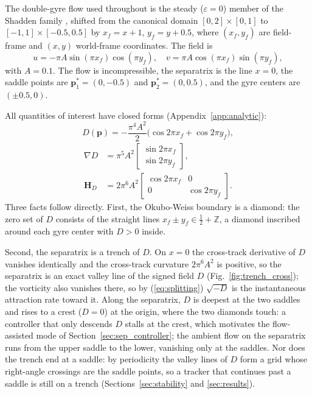 \documentclass[lettersize,journal]{IEEEtran}
\begin{document}
The double-gyre flow used throughout is the steady ($\varepsilon = 0$)
member of the Shadden family \cite{8}, shifted from the canonical domain
$[0,2] \times [0,1]$ to $[-1,1] \times [-0.5, 0.5]$ by
$x_f = x + 1$, $y_f = y + 0.5$, where $(x_f, y_f)$ are field-frame and
$(x, y)$ world-frame coordinates. The field is
\begin{equation}
    u = -\pi A \sin(\pi x_f) \cos(\pi y_f), \quad
    v = \pi A \cos(\pi x_f) \sin(\pi y_f),
    \label{eq:dg_u}
\end{equation}
with $A = 0.1$. The flow is incompressible, the separatrix is the line
$x = 0$, the saddle points are $\mathbf{p}^*_1 = (0, -0.5)$ and
$\mathbf{p}^*_2 = (0, 0.5)$, and the gyre centers are $(\pm 0.5, 0)$.

All quantities of interest have closed forms
(Appendix~\ref{app:analytic}):
\begin{equation}
    D(\mathbf{p}) = -\frac{\pi^4 A^2}{2}
    \bigl(\cos 2\pi x_f + \cos 2\pi y_f\bigr),
    \label{eq:det_analytic_main}
\end{equation}
\begin{equation}
    \begin{aligned}
    \nabla D &= \pi^5 A^2
    \begin{bmatrix} \sin 2\pi x_f \\ \sin 2\pi y_f \end{bmatrix},
    \\
    \mathbf{H}_D &= 2\pi^6 A^2
    \begin{bmatrix} \cos 2\pi x_f & 0 \\ 0 & \cos 2\pi y_f \end{bmatrix}.
    \end{aligned}
    \label{eq:gradhess_analytic_main}
\end{equation}
Three facts follow directly. First, the Okubo-Weiss boundary is a
diamond: the zero set of $D$ consists of the straight lines $x_f \pm
y_f \in \tfrac{1}{2} + \mathbb{Z}$, a diamond inscribed around each
gyre center with $D > 0$ inside.

Second, the separatrix is a trench of $D$. On $x = 0$ the cross-track
derivative of $D$ vanishes identically and the cross-track curvature
$2\pi^6 A^2$ is positive, so the separatrix is an exact valley line of
the signed field $D$ (Fig.~\ref{fig:trench_cross}); the vorticity also
vanishes there, so by (\ref{eq:splitting}) $\sqrt{-D}$ is the
instantaneous attraction rate toward it. Along the separatrix, $D$ is
deepest at the two saddles and rises to a crest ($D = 0$) at the
origin, where the two diamonds touch: a controller that only descends
$D$ stalls at the crest, which motivates the flow-assisted mode of
Section~\ref{sec:sep_controller}; the ambient flow on the separatrix
runs from the upper saddle to the lower, vanishing only at the saddles.
Nor does the trench end at a saddle: by periodicity the valley lines of
$D$ form a grid whose right-angle crossings are the saddle points, so a
tracker that continues past a saddle is still on a trench
(Sections~\ref{sec:stability} and \ref{sec:results}).
\end{document}
